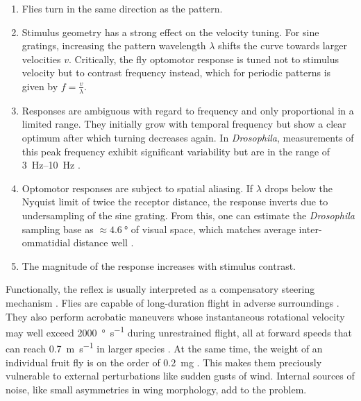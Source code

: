 \begin{enumerate}
    \item Flies turn in the same direction as the pattern.
    \item Stimulus geometry has a strong effect on the velocity tuning. For sine gratings, increasing the pattern wavelength $\lambda$ shifts the curve towards larger velocities $v$. Critically, the fly optomotor response is tuned not to stimulus velocity but to contrast frequency instead, which for periodic patterns is given by $f = \frac{v}{\lambda}$.
    \item Responses are ambiguous with regard to frequency and only proportional in a limited range. They initially grow with temporal frequency but show a clear optimum after which turning decreases again. In \textit{Drosophila}, measurements of this peak frequency exhibit significant variability but are in the range of \SIrange{3}{10}{\hertz} \citep{Goetz:1973aa,Duistermars:2007aa}.
    \item Optomotor responses are subject to spatial aliasing. If $\lambda$ drops below the Nyquist limit of twice the receptor distance, the response inverts due to undersampling of the sine grating. From this, one can estimate the \textit{Drosophila} sampling base as $\approx \SI{4.6}{\degree}$ of visual space, which matches average inter-ommatidial distance well \citep{Gotz:1964bj}.
    \item The magnitude of the response increases with stimulus contrast.
\end{enumerate}

Functionally, the reflex is usually interpreted as a compensatory steering mechanism \citep{Gotz:1968aa,Heisenberg:1984aa}. Flies are capable of long-duration flight in adverse surroundings \citep{Goetz:1987aa,Dickinson:2014aa}. They also perform acrobatic maneuvers whose instantaneous rotational velocity may well exceed \SI{2000}{\degree\per\second} during unrestrained flight, all at forward speeds that can reach \SI{0.7}{\metre\per\second} in larger species \citep{Land:1974dp,Mronz:2008eb}. At the same time, the weight of an individual fruit fly is on the order of \SI{0.2}{\milli\gram} \citep{Seiger:1966a}. This makes them preciously vulnerable to external perturbations like sudden gusts of wind. Internal sources of noise, like small asymmetries in wing morphology, add to the problem.

